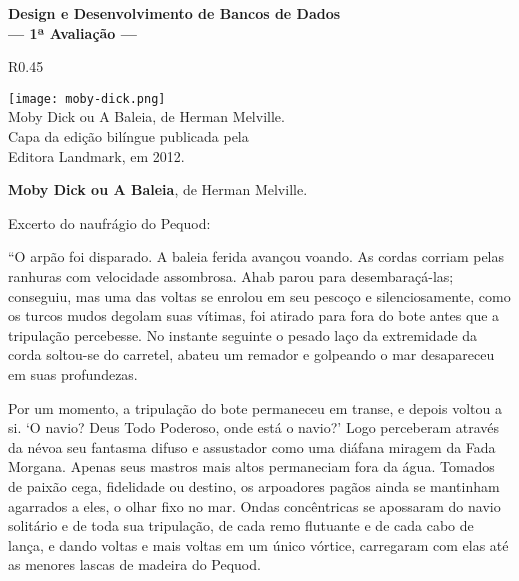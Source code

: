 \documentclass[12pt, addpoints]{exam}
\begin{document}
\begin{coverpages}

\begin{center}
\textbf{\Large%
Design e Desenvolvimento de Bancos de Dados\\
--- 1ª Avaliação ---}
\end{center}

\vspace{0.6cm}

\begin{wrapfigure}{R}{0.45  \textwidth}
\vspace{-0.7cm}
\begin{center}
\texttt{[image: moby-dick.png]}\\
\footnotesize{Moby Dick ou A Baleia, de Herman Melville.\\
Capa da edição bilíngue publicada pela\\
Editora Landmark, em 2012.}
\vspace{-0.7cm}
\end{center}
\end{wrapfigure}

\begin{center}
\textbf{Moby Dick ou A Baleia}, de Herman Melville.

\vspace{0.5cm}
Excerto do naufrágio do Pequod:
\end{center}
\vspace{-0.3cm}
\small{%
``O arpão foi disparado. A baleia ferida avançou voando. As cordas corriam pelas
ranhuras com velocidade assombrosa. Ahab parou para desembaraçá-las; conseguiu,
mas uma das voltas se enrolou em seu pescoço e silenciosamente, como os turcos
mudos degolam suas vítimas, foi atirado para fora do bote antes que a
tripulação percebesse. No instante seguinte o pesado laço da extremidade da
corda soltou-se do carretel, abateu um remador e golpeando o mar desapareceu em
suas profundezas.

Por um momento, a tripulação do bote permaneceu em transe, e depois voltou a si.
`O navio? Deus Todo Poderoso, onde está o navio?' Logo perceberam através da
névoa seu fantasma difuso e assustador como uma diáfana miragem da Fada Morgana.
Apenas seus mastros mais altos permaneciam fora da água. Tomados de paixão cega,
fidelidade ou destino, os arpoadores pagãos ainda se mantinham agarrados a eles,
o olhar fixo no mar. Ondas concêntricas se apossaram do navio solitário e de
toda sua tripulação, de cada remo flutuante e de cada cabo de lança, e dando
voltas e mais voltas em um único vórtice, carregaram com elas até as menores
lascas de madeira do Pequod.

}
\end{coverpages}
\end{document}
